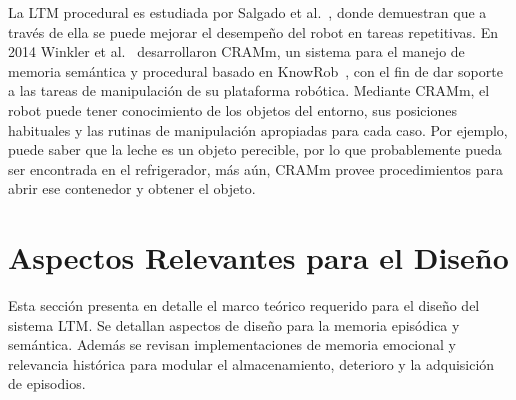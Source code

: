 La LTM procedural es estudiada por Salgado et al.~\cite{Salgado2012}, donde demuestran que a través de ella se puede mejorar el desempeño del robot en tareas repetitivas. En 2014 Winkler et al.~\cite{Winkler2014} desarrollaron CRAMm, un sistema para el manejo de memoria semántica y procedural basado en KnowRob~\cite{Tenorth2013}, con el fin de dar soporte a las tareas de manipulación de su plataforma robótica. Mediante CRAMm, el robot puede tener conocimiento de los objetos del entorno, sus posiciones habituales y las rutinas de manipulación apropiadas para cada caso. Por ejemplo, puede saber que la leche es un objeto perecible, por lo que probablemente pueda ser encontrada en el refrigerador, más aún, CRAMm provee procedimientos para abrir ese contenedor y obtener el objeto.









\section{Aspectos Relevantes para el Diseño}

Esta sección presenta en detalle el marco teórico requerido para el diseño del sistema LTM. Se detallan aspectos de diseño para la memoria episódica y semántica. Además se revisan implementaciones de memoria emocional y relevancia histórica para modular el almacenamiento, deterioro y la adquisición de episodios.

